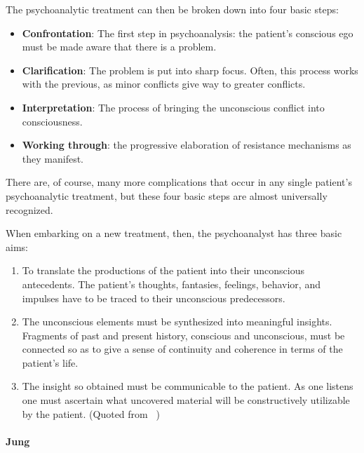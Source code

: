 \begin{refsection}
The psychoanalytic treatment can then be broken down into four basic steps:

\begin{itemize}
\item \textbf{Confrontation}: The first step in psychoanalysis: the patient's conscious ego must be made aware that there is a problem. 

\item \textbf{Clarification}: The problem is put into sharp focus. Often, this process works with the previous, as minor conflicts give way to greater conflicts.

\item \textbf{Interpretation}: The process of bringing the unconscious conflict into consciousness.

\item \textbf{Working through}: the progressive elaboration of resistance mechanisms as they manifest.

\end{itemize}

There are, of course, many more complications that occur in any single patient's psychoanalytic treatment, but these four basic steps are almost universally recognized.

When embarking on a new treatment, then, the psychoanalyst has three basic aims:

\begin{enumerate}
\item To translate the productions of the patient into their unconscious antecedents. The patient's thoughts, fantasies, feelings, behavior, and impulses have to be traced to their unconscious predecessors.

\item The unconscious elements must be synthesized into meaningful insights. Fragments of past and present history, conscious and unconscious, must be connected so as to give a sense of continuity and coherence in terms of the patient's life.

\item The insight so obtained must be communicable to the patient. As one listens one must ascertain what uncovered material will be constructively utilizable by the patient. (Quoted from ~\citep[p. 779]{Arieti:1974tm})

\end{enumerate}

\paragraph{Jung}
\label{jung}


\end{refsection}
